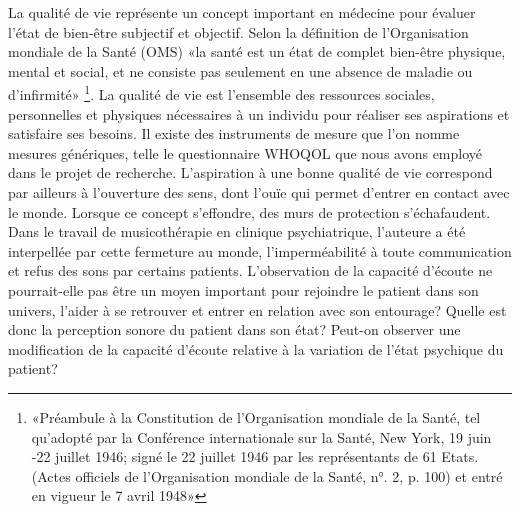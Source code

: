 La qualité de vie représente un concept important en médecine pour évaluer l'état de bien-être subjectif
et objectif. Selon la définition de l'Organisation mondiale de la Santé (OMS) «la santé est un état de 
complet bien-être physique, mental et social, et ne consiste pas seulement en une absence de maladie 
ou d’infirmité» \footnote{«Préambule à la Constitution de l'Organisation mondiale de la Santé, tel 
qu'adopté par la 
Conférence internationale sur la Santé, New York, 19 juin -22 juillet 1946; signé le 22 juillet 1946 par les 
représentants de 61 Etats. (Actes officiels de l'Organisation mondiale de la Santé, n°. 2, p. 100) et entré 
en vigueur le 7 avril 1948»}.
La  qualité de vie est 
l'ensemble 
des ressources sociales, 
personnelles et physiques nécessaires à un individu pour réaliser ses aspirations et satisfaire ses 
besoins. Il existe des instruments de mesure que l'on nomme mesures génériques, telle le 
questionnaire  WHOQOL 
que 
nous avons employé dans le projet de recherche.
L'aspiration à une bonne qualité de vie correspond par ailleurs  à l'ouverture des sens, dont l'ouïe qui 
permet d'entrer 
en contact avec le monde.
Lorsque ce concept s'effondre, des murs de protection s'échafaudent.
Dans le travail de musicothérapie en clinique psychiatrique, l'auteure a été interpellée par cette 
fermeture au monde, l'imperméabilité à 
 toute 
 communication et refus des sons par certains patients. L'observation de la capacité d'écoute  ne 
 pourrait-elle  pas être un moyen important pour rejoindre le patient dans son univers, l'aider à se 
 retrouver et entrer en relation avec son entourage?  Quelle est donc la perception sonore du patient 
 dans 
 son état?
   Peut-on observer une modification de la capacité d'écoute relative à la variation de l'état psychique du 
   patient?
